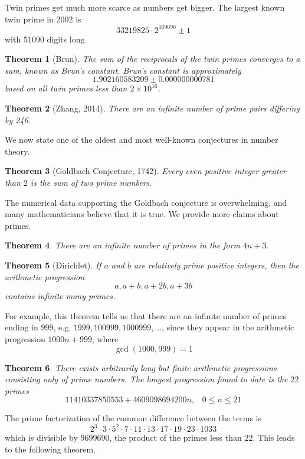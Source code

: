 \documentclass{article}
\newtheorem{theorem}{Theorem}[section]
\theoremstyle{remark}
\theoremstyle{definition}
\begin{document}
Twin primes get much more scarce as numbers get bigger. The largest known twin prime in 2002 is 
\[33219825 \cdot 2^{169690} \pm 1\]
with 51090 digits long. 

\begin{theorem}[Brun]
The sum of the reciprocals of the twin primes converges to a sum, known as \textit{Brun's constant}. Brun's constant is approximately
\[1.902160583209\pm 0.000000000781\]
based on all twin primes less than $2 \times 10^{16}$.
\end{theorem}

\begin{theorem}[Zhang, 2014]
There are an infinite number of prime pairs differing by 246. 
\end{theorem}

We now state one of the oldest and most well-known conjectures in number theory. 

\begin{theorem}[Goldbach Conjecture, 1742]
Every even positive integer greater than $2$ is the sum of two prime numbers. 
\end{theorem}
The numerical data supporting the Goldbach conjecture is overwhelming, and many mathematicians believe that it is true. We provide more claims about primes. 

\begin{theorem}
There are an infinite number of primes in the form $4n + 3$. 
\end{theorem}

\begin{theorem}[Dirichlet]
If $a$ and $b$ are relatively prime positive integers, then the arithmetic progression
\[a, a + b, a + 2b, a + 3b\]
contains infinite many primes. 
\end{theorem}

For example, this theorem tells us that there are an infinite number of primes ending in $999$, e.g. $1999, 100999, 1000999, \ldots$, since they appear in the arithmetic progression $1000n + 999$, where 
  \[\gcd(1000, 999) = 1\]

\begin{theorem}
There exists arbitrarily long but finite arithmetic progressions consisting only of prime numbers. The longest progression found to date is the $22$ primes
\[11410337850553 + 4609098694200 n, \;\;\; 0 \leq n \leq 21\]
\end{theorem}
The prime factorization of the common difference between the terms is 
\[2^3 \cdot 3 \cdot 5^2 \cdot 7 \cdot 11 \cdot 13 \cdot 17 \cdot 19 \cdot 23 \cdot 1033\]
which is divisible by $9699690$, the product of the primes less than $22$. This leads to the following theorem. 
\end{document}
